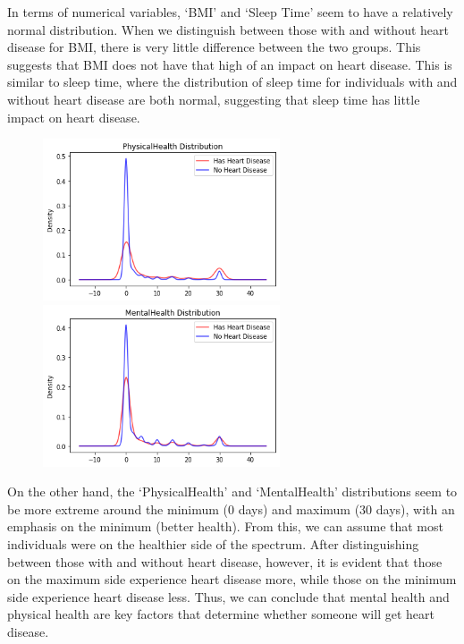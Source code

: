 \documentclass[a4paper]{article}
\begin{document}
In terms of numerical variables, ‘BMI’ and ‘Sleep Time’ seem to have a relatively normal distribution. When we distinguish between those with and without heart disease for BMI, there is very little difference between the two groups. This suggests that BMI does not have that high of an impact on heart disease. This is similar to sleep time, where the distribution of sleep time for individuals with and without heart disease are both normal, suggesting that sleep time has little impact on heart disease.

\begin{figure}[H]
    \centering
    \includegraphics[width=7cm]{images/physicalhealth.png}
    \includegraphics[width=7cm]{images/mentalhealth.png}
\end{figure}

On the other hand, the ‘PhysicalHealth’ and ‘MentalHealth’ distributions seem to be more extreme around the minimum (0 days) and maximum (30 days), with an emphasis on the minimum (better health). From this, we can assume that most individuals were on the healthier side of the spectrum. After distinguishing between those with and without heart disease, however, it is evident that those on the maximum side experience heart disease more, while those on the minimum side experience heart disease less. Thus, we can conclude that mental health and physical health are key factors that determine whether someone will get heart disease.
\end{document}
